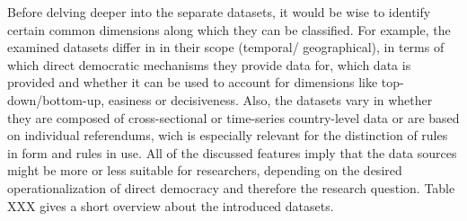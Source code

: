\documentclass{systats}
\begin{document}
Before delving deeper into the separate datasets, it would be wise to identify certain common dimensions along which they can be classified. For example, the examined datasets differ in in their scope (temporal/ geographical), in terms of which direct democratic mechanisms they provide data for, which data is provided and whether it can be used to account for dimensions like top-down/bottom-up, easiness or decisiveness. Also, the datasets vary in whether they are composed of cross-sectional or time-series country-level data or are based on individual referendums, wich is especially relevant for the distinction of rules in form and rules in use. All of the discussed features imply that the data sources might be more or less suitable for researchers, depending on the desired operationalization of direct democracy and therefore the research question. Table XXX gives a short overview about the introduced datasets.
\end{document}
